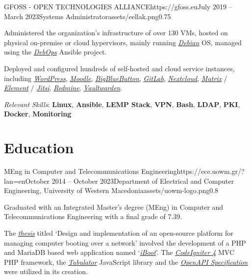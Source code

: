\documentclass{mycv}
\begin{document}
	\begin{EntryDatedLogo}{GFOSS - OPEN TECHNOLOGIES ALLIANCE}{https://gfoss.eu}{July 2019 -- March 2023}{Systems Administrator}{assets/eellak.png}{0.75}
		\begin{Itemize}
			\item Administered the organization's infrastructure of over 130 VMs, hosted on physical on-premise or cloud hypervisors, mainly running \href{https://www.debian.org}{\textit{Debian}} OS, managed using the \href{https://debops.org}{\textit{DebOps}} Ansible project.
			\item Deployed and configured hundreds of self-hosted and cloud service instances, including \href{https://wordpress.com}{\textit{WordPress}}, \href{https://moodle.org}{\textit{Moodle}}, \href{https://bigbluebutton.org}{\textit{BigBlueButton}}, \href{https://about.gitlab.com/install/}{\textit{GitLab}}, \href{https://nextcloud.com}{\textit{Nextcloud}}, \href{https://matrix.org}{\textit{Matrix}} / \href{https://element.io}{\textit{Element}} / \href{https://jitsi.org}{\textit{Jitsi}}, \href{https://www.redmine.org/}{\textit{Redmine}}, \href{https://vaultwarden.discourse.group/}{\textit{Vaultwarden}}.
		\end{Itemize}
		\vspace{-0.3cm}
		\textit{Relevant Skills}: \textbf{Linux}, \textbf{Ansible}, \textbf{LEMP Stack}, \textbf{VPN}, \textbf{Bash}, \textbf{LDAP}, \textbf{PKI}, \textbf{Docker}, \textbf{Monitoring}
	\end{EntryDatedLogo}

	\section{Education}

	\begin{EntryDatedLogo}{MEng in Computer and Telecommunications Engineering}{https://ece.uowm.gr/?lan=en}{October 2014 -- October 2023}{Department of Electrical and Computer Engineering, University of Western Macedonia}{assets/uowm-logo.png}{0.8}
		\begin{Itemize}
			\item Graduated with an Integrated Master’s degree (MEng) in Computer and Telecommunications Engineering with a final grade of 7.39.
			\item The \href{https://github.com/ChrisKar96/Thesis}{\textit{thesis}} titled `Design and implementation of an open-source platform for managing computer booting over a network' involved the development of a PHP and MariaDB based web application named `\href{https://github.com/ChrisKar96/iBoot-Thesis}{\textit{iBoot}}'. The \href{https://codeigniter.com/}{\textit{CodeIgniter 4}} MVC PHP framework, the \href{https://tabulator.info/}{\textit{Tabulator}} JavaScript library and the \href{https://swagger.io/specification/}{\textit{OpenAPI Specification}} were utilized in its creation.
   \end{Itemize}
	\end{EntryDatedLogo}
\end{document}

